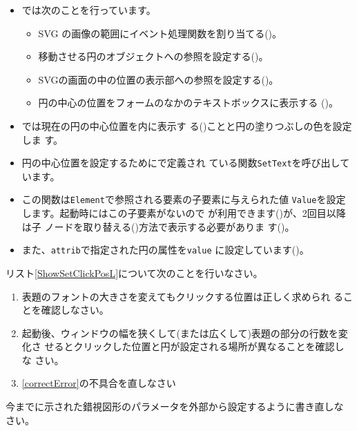 \begin{itemize}
 \item {}では次のことを行っています。
\begin{itemize}
 \item SVG の画像の範囲にイベント処理関数を割り当てる()。
 \item 移動させる円のオブジェクトへの参照を設定する()。
 \item SVGの画面の中の位置の表示部への参照を設定する()。
 \item 円の中心の位置をフォームのなかのテキストボックスに表示する
       ()。
\end{itemize}
 \item {}では現在の円の中心位置を\SVG 内に表示す
       る()ことと円の塗りつぶしの色を設定しま
       す。
 \item 円の中心位置を設定するためにで定義され
       ている関数\texttt{SetText}を呼び出しています。
 \item この関数は\texttt{Element}で参照される要素の子要素に与えられた値
       \texttt{Value}を設定します。起動時にはこの子要素がないので
       が利用できます()が、2回目以降は子
       ノードを取り替える()方法で表示する必要がありま
       す()。
 \item また、\texttt{attrib}で指定された円の属性を\texttt{value}
       に設定しています()。
\end{itemize}
\fi
\begin{Problem}\upshape
 リスト\ref{ShowSetClickPosL}について次のことを行いなさい。
\begin{enumerate}
 \item 表題のフォントの大きさを変えてもクリックする位置は正しく求められ
       ることを確認しなさい。
 \item 起動後、ウィンドウの幅を狭くして(または広くして)表題の部分の行数を変化さ
       せるとクリックした位置と円が設定される場所が異なることを確認しな
       さい。\label{correctError}
 \item \ref{correctError}の不具合を直しなさい
\end{enumerate}
\end{Problem}
\begin{Problem}
 今までに示された錯視図形のパラメータを外部から設定するように書き直しな
 さい。
\end{Problem}